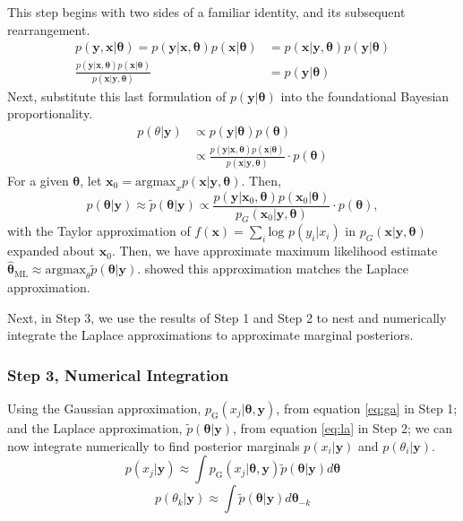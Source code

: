 This step begins with two sides of a familiar identity, and its subsequent rearrangement.
\begin{align}
p(\pmb{y} , \pmb{x} | \pmb{\theta}) = p(\pmb{y} | \pmb{x}, \pmb{\theta}) p(\pmb{x} | \pmb{\theta})  &= p(\pmb{x} | \pmb{y}, \pmb{\theta}) p(\pmb{y} | \pmb{\theta}) \\
\frac{p(\pmb{y} | \pmb{x}, \pmb{\theta}) p(\pmb{x} | \pmb{\theta})} {p(\pmb{x} | \pmb{y}, \pmb{\theta})} &= p(\pmb{y} | \pmb{\theta})  
\end{align}
Next, substitute this last formulation of $p(\pmb{y}|\pmb{\theta})$ into the foundational Bayesian proportionality.
\begin{align}
p(\theta|\pmb{y}) & \propto p(\pmb{y}|\pmb{\theta})p(\pmb{\theta}) \\
& \propto \frac{p(\pmb{y} | \pmb{x}, \pmb{\theta}) p(\pmb{x} | \pmb{\theta})}{p(\pmb{x} | \pmb{y}, \pmb{\theta})} \cdot p(\pmb{\theta})
\end{align}
For a given $\pmb{\theta}$, let $\pmb{x}_{0} = \text{argmax}_{x}p(\pmb{x}|\pmb{y},\pmb{\theta})$. Then,
\begin{equation} \label{eq:la}
p(\pmb{\theta}|\pmb{y}) \approx \tilde{p}(\pmb{\theta}|\pmb{y}) \propto  \frac{p(\pmb{y} | \pmb{x}_{0}, \pmb{\theta}) p(\pmb{x}_{0} | \pmb{\theta})}{p_{G}(\pmb{x}_{0} | \pmb{y}, \pmb{\theta})} \cdot p(\pmb{\theta}),
\end{equation}
with the Taylor approximation of $f(\pmb{x}) = \sum_{i} \text{log }p(y_{i}|x_{i})$ in $p_{G}(\pmb{x} | \pmb{y}, \pmb{\theta})$ expanded about $\pmb{x}_{0}$. Then, we have approximate maximum likelihood estimate $\hat{\pmb{\theta}}_{\text{ML}} \approx \text{argmax}_{\theta} \tilde{p}(\pmb{\theta}|\pmb{y})$. \cite{Tierney1986} showed this approximation matches the Laplace approximation. 

Next, in Step 3, we use the results of Step 1 and Step 2 to nest and numerically integrate the Laplace approximations to approximate marginal posteriors.

\subsubsection{Step 3, Numerical Integration} %
Using the Gaussian approximation, $p_{\text{G}}(x_{j}|\pmb{\theta, y})$, from equation \ref{eq:ga} in Step 1; and the Laplace approximation, $\tilde{p}(\pmb{\theta}|\pmb{y})$, from equation \ref{eq:la} in Step 2; we can now integrate numerically to find posterior marginals $p(x_{i}|\pmb{y})$ and $p(\theta_{i}|\pmb{y})$. 
        $$ p(x_{j} | \pmb{y}) \approx \int p_{\text{G}}(x_{j}|\pmb{\theta, y})\tilde{p}(\pmb{\theta}|\pmb{y}) d\pmb{\theta} $$
        $$ p(\theta_{k} | \pmb{y}) \approx \int \tilde{p}(\pmb{\theta}|\pmb{y}) d\pmb{\theta}_{-k} $$
        
